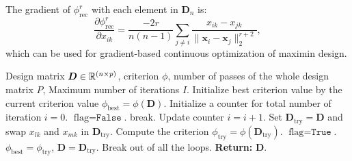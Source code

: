 The gradient of $\phi^r_{\text{rec}}$ with each element in $\bm{D}_n$ is:
\begin{equation}
    \frac{\partial \phi^r_{\text{rec}}}{\partial x_{ik}} = \frac{-2r}{n(n-1)}\sum_{j\neq i}\frac{x_{ik}-x_{jk}}{\|\bm{x}_i-\bm{x}_j\|_2^{r+2}},
\end{equation}
which can be used for gradient-based continuous optimization of maximin design. 

\begin{algorithm}
   \caption{: deterministic swap for LHD}
   \label{alg:det}
   \begin{algorithmic}[1]
   \Require Design matrix $\bm{D} \in \mathbb R^{(n\times p)}$, criterion $\phi$, number of passes of the whole design matrix $P$, Maximum number of iterations $I$.
        \State Initialize best criterion value by the current criterion value $\phi_{\text{best}}=\phi(\bm{D})$.
        \State Initialize a counter for total number of iteration $i=0$.
            \State $\text{flag} = \texttt{False}$.
                         break.\EndIf
                        \State Update counter $i = i+1$.
                        \State Set $\bm{D}_{\text{try}} = \bm{D}$ and swap $x_{lk}$ and $x_{mk}$ in $\bm{D}_{\text{try}}$.
                        \State Compute the criterion $\phi_{\text{try}} = \phi(\bm{D}_{\text{try}})$.
                        \State $\text{flag} = \texttt{True}$.
                        \State $\phi_{\text{best}} = \phi_{\text{try}}$, $\bm{D}=\bm{D}_{\text{try}}$.
                    \EndIf
                    \EndFor
                \EndFor
            \EndFor
            \State Break out of all the loops.
            \EndIf
        \EndFor
   \State \textbf{Return:} $\bm{D}$.
\end{algorithmic}
\end{algorithm} 


